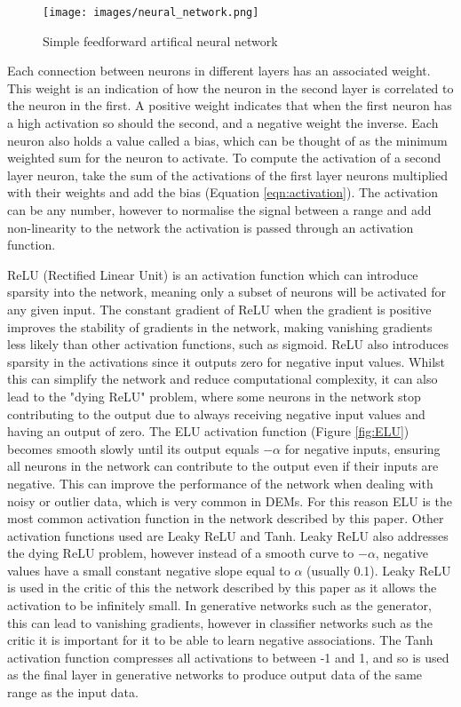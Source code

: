 \documentclass[twocolumn]{article}
\begin{document}
\begin{figure}[htbp]
\centering
\texttt{[image: images/neural\_network.png]}
\caption{\label{fig:neural_network}Simple feedforward artifical neural network\autocite{ArtificialNeuralNetwork2023}}
\end{figure}

Each connection between neurons in different layers has an associated weight.
This weight is an indication of how the neuron in the second layer is correlated to the neuron in the first.
A positive weight indicates that when the first neuron has a high activation so should the second, and a negative weight the inverse.
Each neuron also holds a value called a bias, which can be thought of as the minimum weighted sum for the neuron to activate.
To compute the activation of a second layer neuron, take the sum of the activations of the first layer neurons multiplied with their weights and add the bias (Equation \ref{eqn:activation}).
The activation can be any number, however to normalise the signal between a range and add non-linearity to the network the activation is passed through an activation function.

ReLU (Rectified Linear Unit) is an activation function which can introduce sparsity into the network, meaning only a subset of neurons will be activated for any given input.
The constant gradient of ReLU when the gradient is positive improves the stability of gradients in the network, making vanishing gradients less likely than other activation functions, such as sigmoid.
ReLU also introduces sparsity in the activations since it outputs zero for negative input values.
Whilst this can simplify the network and reduce computational complexity, it can also lead to the "dying ReLU" problem, where some neurons in the network stop contributing to the output due to always receiving negative input values and having an output of zero.
The ELU activation function (Figure \ref{fig:ELU}) becomes smooth slowly until its output equals \(-\alpha\) for negative inputs, ensuring all neurons in the network can contribute to the output even if their inputs are negative.
This can improve the performance of the network when dealing with noisy or outlier data, which is very common in DEMs.
For this reason ELU is the most common activation function in the network described by this paper.
Other activation functions used are Leaky ReLU and Tanh.
Leaky ReLU also addresses the dying ReLU problem, however instead of a smooth curve to \(-\alpha\), negative values have a small constant negative slope equal to \(\alpha\) (usually 0.1).
Leaky ReLU is used in the critic of this the network described by this paper as it allows the activation to be infinitely small.
In generative networks such as the generator, this can lead to vanishing gradients, however in classifier networks such as the critic it is important for it to be able to learn negative associations.
The Tanh activation function compresses all activations to between -1 and 1, and so is used as the final layer in generative networks to produce output data of the same range as the input data.
\end{document}
